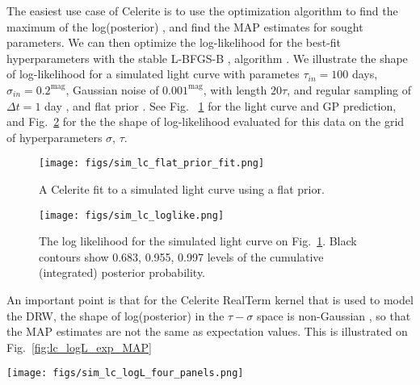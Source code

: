 \documentclass[fleqn,usenatbib]{mnras}  %
\begin{document}
The easiest  use case of Celerite is to use the optimization algorithm to find the maximum of the log(posterior) , and find the MAP estimates for sought parameters. We can then optimize the  log-likelihood  for the best-fit hyperparameters with the stable   L-BFGS-B  \citep{lu1995}, \citep{zhu1997}  algorithm .  We illustrate the shape of log-likelihood for a simulated light curve with parametes  {$\tau_{in}=100$ days, $\sigma_{in} = 0.2^{\mathrm{mag}}$, Gaussian noise of $0.001^{\mathrm{mag}}$, with length $20 \tau$, and regular sampling of $\Delta t = 1 $ day  }, and flat prior . See   Fig. ~\ref{fig:lc_logL_fit}  for the light curve and GP prediction, and Fig.~\ref{fig:lc_logL} for the the shape of log-likelihood evaluated for this data on the grid of hyperparameters $\sigma$, $\tau$. 

\begin{figure}
\texttt{[image: figs/sim\_lc\_flat\_prior\_fit.png]}
\caption{A Celerite fit to a simulated light curve using a flat prior. }
\label{fig:lc_logL_fit}
\end{figure} 

\begin{figure}
\texttt{[image: figs/sim\_lc\_loglike.png]}
\caption{The log likelihood for the simulated light curve on Fig.~\ref{fig:lc_logL_fit}. Black contours show 0.683, 0.955, 0.997 levels of the cumulative (integrated) posterior probability. }
\label{fig:lc_logL}
\end{figure} 


An important point is that for the  Celerite RealTerm kernel that is used to model the DRW,  the shape of log(posterior) in the $\tau-\sigma$ space is non-Gaussian , so that the MAP estimates are not the same as expectation values.  This is illustrated on  Fig.~\ref{fig:lc_logL_exp_MAP}


\begin{figure*}
\texttt{[image: figs/sim\_lc\_logL\_four\_panels.png]}
\caption{For each pixel on the  $\sigma$ - $\tau$ grid we evaluated the log-likelihood value, $\log{L}$, shown on the bottom-right panel (same as Fig.~\ref{fig:lc_logL}). In addition, given these  $\sigma$ and $\tau$ we also evaluated $K$ and $\hat{\sigma}$, which enabled, given $\{ \sigma, \tau, \hat{\sigma}, K, \log{L} \}$, plotting $\log{L}$ in space of $K$-$\hat{\sigma}$, or any other parameter as a function of the other two. }
\label{fig:lc_logL_panels}
\end{figure*} 
\end{document}
